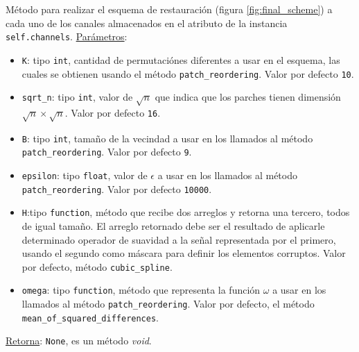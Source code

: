 \begin{enumerate}
\begin{itemize}
		M\'etodo para realizar el esquema de restauraci\'on (figura \ref{fig:final_scheme}) a cada uno de los canales almacenados en el atributo de la instancia \texttt{self.channels}. \underline{Par\'ametros}:
		\begin{itemize}
			\item \texttt{K}: tipo \texttt{int}, cantidad de permutaci\'ones diferentes a usar en el esquema, las cuales se obtienen usando el m\'etodo \texttt{patch\_reordering}. Valor por defecto \texttt{10}.
			\item \texttt{sqrt\_n}: tipo \texttt{int}, valor de $\sqrt{n}$ que indica que los parches tienen dimensi\'on $\sqrt{n} \times \sqrt{n}$. Valor por defecto \texttt{16}.
			\item \texttt{B}: tipo \texttt{int}, tamaño de la vecindad a usar en los llamados al m\'etodo \texttt{patch\_reordering}. Valor por defecto \texttt{9}.
			\item \texttt{epsilon}: tipo \texttt{float}, valor de $\epsilon$ a usar en los llamados al m\'etodo \\\texttt{patch\_reordering}. Valor por defecto \texttt{10000}.
			\item \texttt{H}:tipo \texttt{function}, m\'etodo que recibe dos arreglos y retorna una tercero, todos de igual tamaño. El arreglo retornado debe ser el resultado de aplicarle determinado operador de suavidad a la señal representada por el primero, usando el segundo como m\'ascara para definir los elementos corruptos. Valor por defecto, m\'etodo \texttt{cubic\_spline}.
			\item \texttt{omega}: tipo \texttt{function}, m\'etodo que representa la funci\'on $\omega$ a usar en los llamados al m\'etodo \texttt{patch\_reordering}. Valor por defecto, el m\'etodo \texttt{mean\_of\_squared\_differences}.
		\end{itemize}
		\underline{Retorna}: \texttt{None}, es un m\'etodo \textit{void}.
	\end{itemize}
\end{enumerate}

